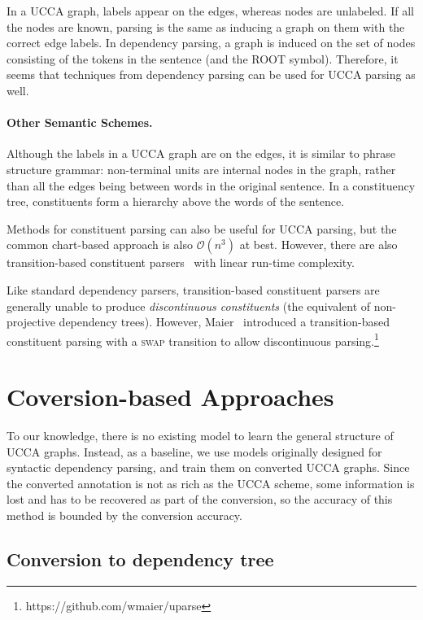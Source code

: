 \documentclass[11pt]{article}
\begin{document}
In a UCCA graph, labels appear on the edges, whereas nodes are unlabeled. If all the nodes are known, parsing is the same as inducing a graph on them with the correct edge labels. In dependency parsing, a graph is induced on the set of nodes consisting of the tokens in the sentence (and the \textsc{ROOT} symbol). Therefore, it seems that techniques from dependency parsing can be used for UCCA parsing as well.

\paragraph{Other Semantic Schemes.}

Although the labels in a UCCA graph are on the edges, it is similar to phrase structure grammar: non-terminal units are internal nodes in the graph, rather than all the edges being between words in the original sentence. In a constituency tree, constituents form a hierarchy above the words of the sentence.

Methods for constituent parsing can also be useful for UCCA parsing, but the common chart-based approach is also $\mathcal{O}(n^3)$ at best. However, there are also transition-based constituent parsers~\cite{zhu2013fast} with linear run-time complexity.

Like standard dependency parsers, transition-based constituent parsers are generally unable to produce \textit{discontinuous constituents} (the equivalent of non-projective dependency trees). However, Maier~ introduced a transition-based constituent parsing with a \textsc{swap} transition to allow discontinuous parsing.\footnote{https://github.com/wmaier/uparse}


\section{Coversion-based Approaches}

To our knowledge, there is no existing model to learn the general structure of UCCA graphs. Instead, as a baseline, we use models originally designed for syntactic dependency parsing, and train them on converted UCCA graphs. Since the converted annotation is not as rich as the UCCA scheme, some information is lost and has to be recovered as part of the conversion, so the accuracy of this method is bounded by the conversion accuracy.

\subsection{Conversion to dependency tree}
\end{document}
